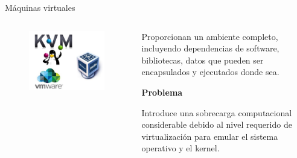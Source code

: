 \documentclass[11pt]{beamer}
\begin{document}
\begin{frame}{Máquinas virtuales}

\begin{columns}
\begin{column}{0.5\textwidth}

  \begin{figure}
  	\includegraphics[scale=0.3]{images/vmachines}
  \end{figure}
\end{column}
\begin{column}{0.5\textwidth}  %

	Proporcionan un ambiente completo, incluyendo dependencias de software, bibliotecas, datos que pueden ser encapsulados y ejecutados donde sea.
	
	\begin{center}
		\textbf{Problema}
	\end{center}
	
Introduce una sobrecarga computacional considerable debido al nivel requerido de virtualización para emular el sistema operativo y el kernel.
\end{column}
\end{columns}
\end{frame}
\end{document}
